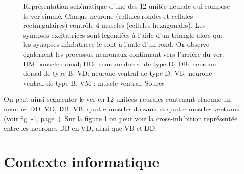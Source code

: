 \begin{figure}[ht]
   \begin{center}
   \end{center}
   \caption{Représentation schématique d'une des 12 unitée neurale qui compose
   le ver simulé. Chaque neurone (cellules rondes et cellules rectangulaires) contrôle 4
   muscles (cellules hexagonales).  Les synapses excitatrices sont legendées à
   l'aide d'un triangle alors que les synapses inhibitrices le sont à l'aide d'un rond.
On observe également les processus neuronaux continuant vers l'arrière du ver. 
DM: muscle dorsal; DD: neurone dorsal de type D; DB: neurone dorsal de type B; VD: neurone ventral de type D; VB: neurone ventral de type B; VM : muscle ventral.
   Source \cite{Boyle2009}}
   \label{fig:celegans_segment}
\end{figure}

On peut ainsi segmenter le ver en 12 unitées neurales contenant chacune un neurone DD, VD,
DB, VB, quatre muscles dorsaux et quatre muscles ventraux (voir fig~-\ref{fig:celegans_segment},
page~\pageref{fig:celegans_segment}). Sur la figure \ref{fig:celegans_segment} on peut voir la
cross-inhibition représentée entre les neurones DB en VD, ainsi que VB et DD.



\section{Contexte informatique} %
\label{sec:Contexte informatique}


